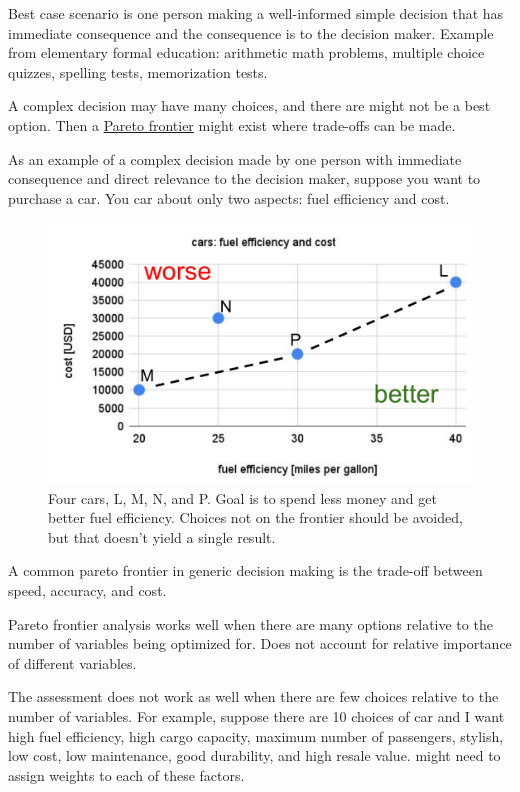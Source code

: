 Best case scenario is one person making a well-informed simple decision that has immediate consequence and the consequence is to the decision maker. Example from elementary formal education: arithmetic math problems, multiple choice quizzes, spelling tests, memorization tests. 

A complex decision may have many choices, and there are might not be a best option. Then a \href{https://en.wikipedia.org/wiki/Pareto_front}{Pareto frontier} might exist where trade-offs can be made. 

As an example of a complex decision made by one person with immediate consequence and direct relevance to the decision maker, suppose you want to purchase a car. You car about only two aspects: fuel efficiency and cost. 

\begin{figure}[ht]
    \centering
    \includegraphics[width=1\textwidth]{images/pareto_frontier_car_options.pdf}
    \caption{Four cars, L, M, N, and P. Goal is to spend less money and get better fuel efficiency. Choices not on the frontier should be avoided, but that doesn't yield a single result.}
    \label{fig:pareto_frontier_cars}
\end{figure}

A common pareto frontier in generic decision making is the trade-off between speed, accuracy, and cost. 

Pareto frontier analysis works well when there are many options relative to the number of variables being optimized for. Does not account for relative importance of different variables.

The assessment does not work as well when there are few choices relative to the number of variables. For example, suppose there are 10 choices of car and I want high fuel efficiency, high cargo capacity, maximum number of passengers, stylish, low cost, low maintenance, good durability, and high resale value. might need to assign weights to each of these factors. 

